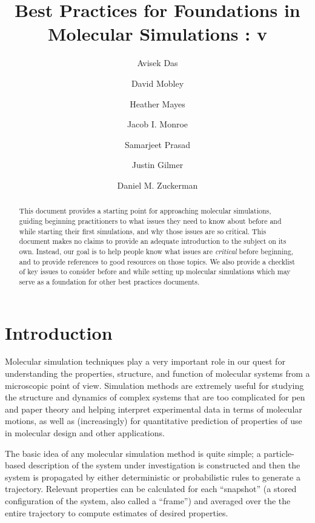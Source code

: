 \documentclass[9pt,bestpractices]{livecoms}
\title{Best Practices for Foundations in Molecular Simulations : v\versionnumber}
\author[1*]{Avisek Das}
\author[2]{David Mobley}
\author[1]{Heather Mayes}
\author[3]{Jacob I. Monroe}
\author[4]{Samarjeet Prasad}
\author[5]{Justin Gilmer}
\author[6]{Daniel M. Zuckerman}
\affil[1]{University of Michigan}
\affil[2]{University of California, Irvine}
\affil[3]{University of California, Santa Barbara}
\affil[4]{National Institutes of Standard and Technology}
\affil[5]{Vanderbilt University}
\affil[6]{Oregon Health and Science University}
\begin{document}
\begin{frontmatter}
\maketitle

\begin{abstract}
This document provides a starting point for approaching molecular simulations, guiding beginning practitioners to what issues they need to know about before and while starting their first simulations, and why those issues are
so critical. 
This document makes no claims to provide an adequate introduction to the subject on its own. Instead, our goal is to help people know what issues are \emph{critical} before beginning, and to provide references to good resources on those topics. 
We also provide a checklist of key issues to consider before and while setting up molecular simulations which may serve as a foundation for other best practices documents.
\end{abstract}
\end{frontmatter}


\todototoc
\listoftodos

\section{Introduction}
\label{sec:intro}


Molecular simulation techniques play a very important role in our quest for understanding the properties, structure, and function of molecular systems from a microscopic point of view.
Simulation methods are extremely useful for studying the structure and dynamics of complex systems that are too complicated for pen and paper theory and helping interpret experimental data in terms of molecular motions, as well as (increasingly) for quantitative prediction of properties of use in molecular design and other applications.

The basic idea of any molecular simulation method is quite simple; a particle-based description of the system under investigation is constructed and then the system is propagated by either deterministic or probabilistic rules to generate a trajectory. 
Relevant properties can be calculated for each ``snapshot'' (a stored configuration of the system, also called a ``frame'') and averaged over the the entire trajectory to compute estimates of desired properties.
\end{document}
